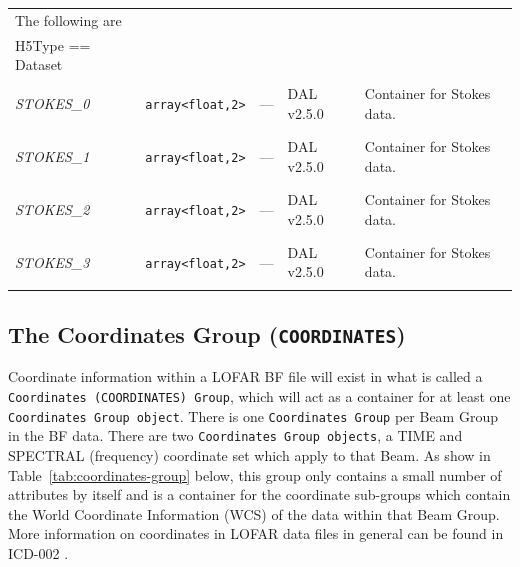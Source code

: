 \documentclass[a4paper,10pt,bibtotoc]{scrartcl}
\begin{document}
\begin{supertabular}{|llllp{5.0cm}|}
  \hline
  \sc The following are & \sc & \sc & \sc   &\\
  \sc H5Type == Dataset & \sc & \sc & \sc   &\\
  \hline
  \begin{scriptsize}\textit{STOKES\_0}\end{scriptsize}  & \verb|array<float,2>| & --- & DAL v2.5.0 & Container for Stokes data. \\
  \begin{scriptsize}\textit{STOKES\_1}\end{scriptsize}  & \verb|array<float,2>| & --- & DAL v2.5.0 & Container for Stokes data. \\
  \begin{scriptsize}\textit{STOKES\_2}\end{scriptsize}  & \verb|array<float,2>| & --- & DAL v2.5.0 & Container for Stokes data. \\
  \begin{scriptsize}\textit{STOKES\_3}\end{scriptsize}  & \verb|array<float,2>| & --- & DAL v2.5.0 & Container for Stokes data. \\
  \hline
\end{supertabular}


\subsection{The Coordinates Group ({\tt COORDINATES})}
\label{sec:coordinates group}

Coordinate information within a LOFAR BF file will exist in what is
called a \texttt{Coordinates (COORDINATES) Group}, which will act as a
container for at least one \texttt{Coordinates Group object}.   There
is one \texttt{Coordinates Group} per Beam Group in the BF data.
There are two \texttt{Coordinates Group objects}, a TIME and SPECTRAL
(frequency) coordinate set which apply to that Beam.  As show in
Table~\ref{tab:coordinates-group} below, this group only contains a
small number of attributes by itself and is a container for the
coordinate sub-groups which contain the World Coordinate Information
(WCS) of the data within that Beam Group.  More information on coordinates
in LOFAR data files in general can be found in ICD-002 \cite{lofar.icd.002}. 



\end{document}
